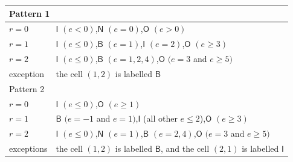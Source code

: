 \documentclass[11pt]{amsart}
\theoremstyle{remark}
\begin{document}
\begin{center}\small
\begin{tabular}{ll}
\toprule
\multicolumn{2}{l}{Pattern 1}\\
\midrule
$r=0$ & $\mathsf I$ $(e<0)$,\quad $\mathsf N$ $(e=0)$,\quad $\mathsf O$ $(e>0)$\\
$r=1$ & $\mathsf I$ $(e\le0)$,\quad $\mathsf B$ $(e=1)$,\quad $\mathsf I$ $(e=2)$,\quad $\mathsf O$ $(e\ge3)$\\
$r=2$ & $\mathsf I$ $(e\le0)$,\quad $\mathsf B$ $(e=1,2,4)$,\quad $\mathsf O$ $(e=3$ and $e\ge5)$\\
exception & the cell $(1,2)$ is labelled $\mathsf B$\\
\midrule
\multicolumn{2}{l}{Pattern 2}\\
\midrule
$r=0$ & $\mathsf I$ $(e\le0)$,\quad $\mathsf O$ $(e\ge1)$\\
$r=1$ & $\mathsf B$ $(e=-1$ and $e=1)$,\quad $\mathsf I$ (all other $e\le2$),\quad $\mathsf O$ $(e\ge3)$\\
$r=2$ & $\mathsf I$ $(e\le0)$,\quad $\mathsf N$ $(e=1)$,\quad $\mathsf B$ $(e=2,4)$,\quad $\mathsf O$ $(e=3$ and $e\ge5)$\\
exceptions & the cell $(1,2)$ is labelled $\mathsf B$, and the cell $(2,1)$ is labelled $\mathsf I$\\
\bottomrule
\end{tabular}
\end{center}
\end{document}
